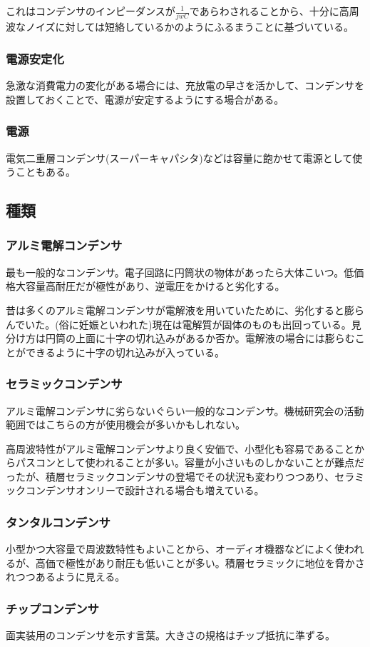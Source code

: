 \documentclass[a4paper,titlepage,here]{ujarticle}
\begin{document}
これはコンデンサのインピーダンスが$\frac{1}{jwC}$であらわされることから、十分に高周波なノイズに対しては短絡しているかのようにふるまうことに基づいている。
\subsubsection{電源安定化}
急激な消費電力の変化がある場合には、充放電の早さを活かして、コンデンサを設置しておくことで、電源が安定するようにする場合がある。
\subsubsection{電源}
電気二重層コンデンサ(スーパーキャパシタ)などは容量に飽かせて電源として使うこともある。
\subsection{種類}
\subsubsection{アルミ電解コンデンサ}
最も一般的なコンデンサ。電子回路に円筒状の物体があったら大体こいつ。低価格大容量高耐圧だが極性があり、逆電圧をかけると劣化する。

昔は多くのアルミ電解コンデンサが電解液を用いていたために、劣化すると膨らんでいた。(俗に妊娠といわれた)現在は電解質が固体のものも出回っている。見分け方は円筒の上面に十字の切れ込みがあるか否か。電解液の場合には膨らむことができるように十字の切れ込みが入っている。
\subsubsection{セラミックコンデンサ}
アルミ電解コンデンサに劣らないぐらい一般的なコンデンサ。機械研究会の活動範囲ではこちらの方が使用機会が多いかもしれない。

高周波特性がアルミ電解コンデンサより良く安価で、小型化も容易であることからパスコンとして使われることが多い。容量が小さいものしかないことが難点だったが、積層セラミックコンデンサの登場でその状況も変わりつつあり、セラミックコンデンサオンリーで設計される場合も増えている。
\subsubsection{タンタルコンデンサ}
小型かつ大容量で周波数特性もよいことから、オーディオ機器などによく使われるが、高価で極性があり耐圧も低いことが多い。積層セラミックに地位を脅かされつつあるように見える。
\subsubsection{チップコンデンサ}
面実装用のコンデンサを示す言葉。大きさの規格はチップ抵抗に準ずる。
\end{document}

